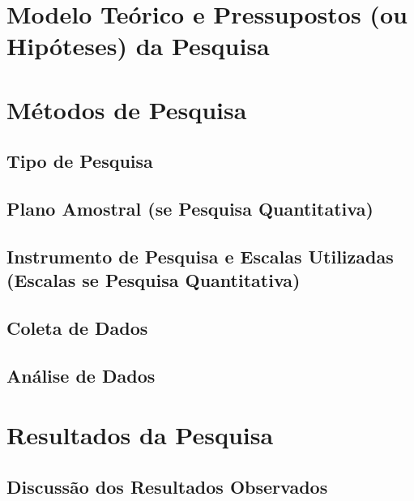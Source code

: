 
\chapter{Modelo Teórico e Pressupostos (ou Hipóteses) da Pesquisa}




\chapter{Métodos de Pesquisa}


\section{Tipo de Pesquisa}


\section{Plano Amostral (se Pesquisa Quantitativa)}


\section{Instrumento de Pesquisa e Escalas Utilizadas (Escalas se Pesquisa Quantitativa)}


\section{Coleta de Dados}


\section{Análise de Dados}



\chapter{Resultados da Pesquisa}

\section{Discussão dos Resultados Observados}






